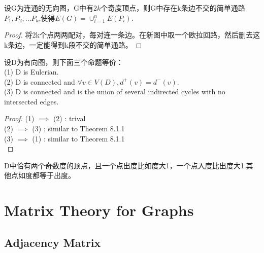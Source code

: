 \documentclass[11pt,fleqn]{book} %
\begin{document}
\begin{CJK}{UTF8}{gkai}
\begin{corollary}
    设G为连通的无向图，G中有$2k$个奇度顶点，则G中存在k条边不交的简单通路$P_1,P_2,...P_k$,使得$E(G) = \cup_{i = 1}^nE(P_i)$.
\end{corollary}
\begin{proof}
    将2k个点两两配对，每对连一条边。在新图中取一个欧拉回路，然后删去这k条边，一定能得到k段不交的简单通路。    
\end{proof}

\begin{theorem}
    [有向欧拉图的判定]
    设D为有向图，则下面三个命题等价： \\
    (1) D is Eulerian. \\
    (2) D is connected and $\forall v \in V(D), d^+(v) = d^-(v)$. \\
    (3) D is connected and is the union of several indirected cycles with no intersected edges.
\end{theorem}
\begin{proof}
    (1) $\implies$ (2) : trival \\
    (2) $\implies$ (3) : similar to Theorem 8.1.1 \\
    (3) $\implies$ (1) : similar to Theorem 8.1.1 \\
\end{proof}

\begin{theorem}
    [有向半欧拉图的判定]
    D中恰有两个奇数度的顶点，且一个点出度比如度大1，一个点入度比出度大1.其他点如度都等于出度。
\end{theorem}

\chapter{Matrix Theory for Graphs}
\section{Adjacency Matrix}

\end{CJK}
\end{document}
